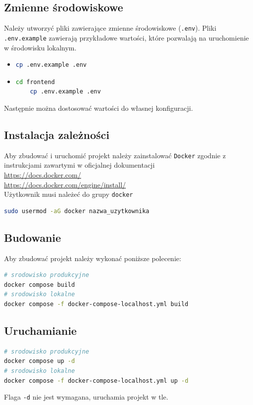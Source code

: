 \documentclass[shortabstract]{iithesis}
\begin{document}
\subsection{Zmienne środowiskowe}
\noindent
Należy utworzyć pliki zawierające zmienne środowiskowe (\texttt{.env}).
Pliki \texttt{.env.example} zawierają przykładowe wartości, które pozwalają na uruchomienie w środowisku lokalnym.
\begin{itemize}
    \item
          \begin{lstlisting}[language=bash]
    cp .env.example .env
    \end{lstlisting}

    \item
          \begin{lstlisting}[language=bash]
    cd frontend
    cp .env.example .env
    \end{lstlisting}
\end{itemize}
Następnie można dostosować wartości do własnej konfiguracji.


\subsection{Instalacja zależności}
Aby zbudować i uruchomić projekt należy zainstalować \texttt{Docker} zgodnie z instrukcjami zawartymi w oficjalnej dokumentacji
\\
\url{https://docs.docker.com/}
\\
\url{https://docs.docker.com/engine/install/}
\\
Użytkownik musi należeć do grupy \texttt{docker}

\begin{lstlisting}[language=bash]
sudo usermod -aG docker nazwa_uzytkownika
\end{lstlisting}

\subsection{Budowanie}
Aby zbudować projekt należy wykonać poniższe polecenie:

\begin{lstlisting}[language=bash]
# srodowisko produkcyjne
docker compose build
# srodowisko lokalne
docker compose -f docker-compose-localhost.yml build
\end{lstlisting}

\subsection{Uruchamianie}
\begin{lstlisting}[language=bash]
# srodowisko produkcyjne
docker compose up -d
# srodowisko lokalne
docker compose -f docker-compose-localhost.yml up -d
\end{lstlisting}
Flaga \texttt{-d} nie jest wymagana, uruchamia projekt w tle.
\end{document}
